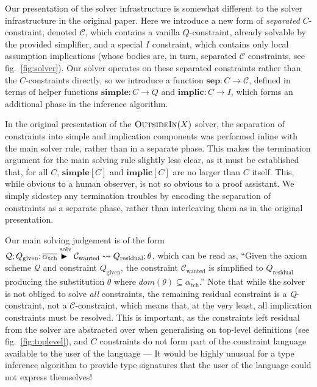 \documentclass[a4paper]{jfp}
\newcommand{\outsidein}{\textsc{OutsideIn}(X)}
\begin{document}
Our presentation of the solver infrastructure is somewhat different to the solver infrastructure in the original paper.  Here we introduce a new form
of \emph{separated} $C$-constraint, denoted $\mathcal{C}$, which contains a vanilla $Q$-constraint, already solvable by the provided simplifier, and
a special $I$ constraint, which contains only local assumption implications (whose bodies are, in turn, separated $\mathcal{C}$ constraints, see
fig.~\ref{fig:solver}). Our solver operates on these separated constraints rather than the $C$-constraints directly, so we introduce a function
$\textbf{sep} : C \rightarrow \mathcal{C}$, defined in terms of helper functions $\textbf{simple} : C \rightarrow Q$ and $\textbf{implic} : C
\rightarrow I$, which forms an additional phase in the inference algorithm.  

In the original presentation of the $\outsidein$ solver, the separation of constraints into simple and implication components was performed inline
with the main solver rule, rather than in a separate phase. This makes the termination argument for the main solving rule slightly less clear, as it
must be established that, for all $C$, $\textbf{simple}[C]$ and $\textbf{implic}[C]$ are no larger than $C$ itself. This, while obvious to a human
observer, is not so obvious to a proof assistant. We simply sidestep any termination troubles by encoding the separation of constraints as a separate
phase, rather than interleaving them as in the original presentation.

Our main solving judgement is of the form $\mathcal{Q};Q_{\text{given}}; \overline{\alpha_\text{tch}} \stackrel{\text{solv}}{\vdash\!\!\!\!\blacktriangleright\ }
\mathcal{C}_{\text{wanted}} \leadsto Q_{\text{residual}};\theta$, which can be read as, ``Given the axiom scheme $\mathcal{Q}$ and constraint
$Q_\text{given}$, the constraint $\mathcal{C}_{\text{wanted}}$ is simplified to $Q_{\text{residual}}$ producing the substitution $\theta$ where
$\mathit{dom}(\theta) \subseteq \overline{\alpha_\text{tch}}$.'' Note that while the solver is not obliged to solve \emph{all} constraints, the
remaining residual constraint is a \emph{Q}-constraint, not a $\mathcal{C}$-constraint, which means that, at the very least, all implication
constraints must be resolved. This is important, as the constraints left residual from the solver are abstracted over when generalising on top-level
definitions (see fig.~\ref{fig:toplevel}), and $C$ constraints do not form part of the constraint language available to the user of the language ---
It would be highly unusual for a type inference algorithm to provide type signatures that the user of the language could not express themselves! 
\end{document}

